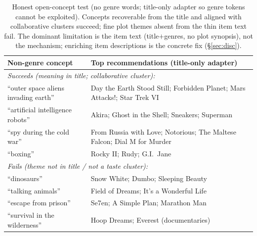 \documentclass[11pt]{article}
\begin{document}
\begin{table}[h]\centering\small
\begin{tabular}{l p{8.6cm}}
\toprule
Non-genre concept & Top recommendations (title-only adapter)\\
\midrule
\multicolumn{2}{l}{\emph{Succeeds (meaning in title; collaborative cluster):}}\\
``outer space aliens invading earth'' & Day the Earth Stood Still; Forbidden Planet; Mars Attacks!; Star Trek VI\\
``artificial intelligence robots'' & Akira; Ghost in the Shell; Sneakers; Superman\\
``spy during the cold war'' & From Russia with Love; Notorious; The Maltese Falcon; Dial M for Murder\\
``boxing'' & Rocky II; Rudy; G.I.\ Jane\\
\midrule
\multicolumn{2}{l}{\emph{Fails (theme not in title / not a taste cluster):}}\\
``dinosaurs'' & Snow White; Dumbo; Sleeping Beauty\\
``talking animals'' & Field of Dreams; It's a Wonderful Life\\
``escape from prison'' & Se7en; A Simple Plan; Marathon Man\\
``survival in the wilderness'' & Hoop Dreams; Everest (documentaries)\\
\bottomrule
\end{tabular}
\caption{Honest open-concept test (no genre words; title-only adapter so genre tokens cannot be exploited). Concepts
recoverable from the title and aligned with collaborative clusters succeed; fine plot themes absent from the thin
item text fail. The dominant limitation is the item text (title$+$genres, no plot synopsis), not the mechanism;
enriching item descriptions is the concrete fix (\S\ref{sec:disc}).}
\label{tab:concepts}
\end{table}
\end{document}
